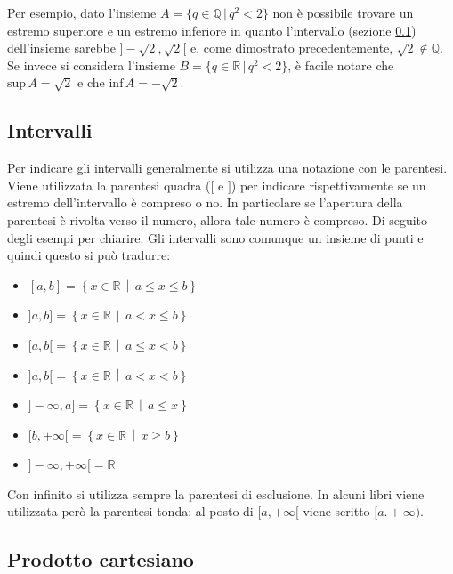 Per esempio, dato l'insieme $A = \{q \in \mathbb{Q}\,|\,q^2 < 2\}$ non è possibile trovare un estremo superiore e un estremo inferiore in quanto l'intervallo (sezione \ref{intervalli}) dell'insieme sarebbe $]-\sqrt{2}, \sqrt{2}[$ e, come dimostrato precedentemente, $\sqrt{2} \notin \mathbb{Q}$. Se invece si considera l'insieme $B = \{q \in \mathbb{R}\,|\,q^2 < 2\}$, è facile notare che $\mathrm{sup}\,A = \sqrt{2}$ e che $\mathrm{inf}\, A = -\sqrt{2}$.

\subsection{Intervalli} \label{intervalli}
Per indicare gli intervalli generalmente si utilizza una notazione con le parentesi. Viene utilizzata la parentesi quadra ($[$ e $]$) per indicare rispettivamente se un estremo dell'intervallo è compreso o no. In particolare se l'apertura della parentesi è rivolta verso il numero, allora tale numero è compreso. Di seguito degli esempi per chiarire. Gli intervalli sono comunque un insieme di punti e quindi questo si può tradurre:
\begin{itemize}
    \item $[a, b] = \left\{ x \in \mathbb{R}\, \middle|\, a \leq x 	\leq b\right\}$
    \item $]a, b] = \left\{ x \in \mathbb{R}\, \middle|\, a < x \leq b\right\}$
    \item $[a, b[ = \left\{ x \in \mathbb{R}\, \middle|\, a \leq x < b\right\}$
    \item $]a, b[ = \left\{ x \in \mathbb{R}\, \middle|\, a < x < b\right\}$
    
    \item $]-\infty, a] = \left\{ x \in \mathbb{R}\, \middle|\, a \leq x \right\}$
    \item $[b, +\infty[ = \left\{ x \in \mathbb{R}\, \middle|\, x \geq b \right\}$
    \item $]-\infty, +\infty[ = \mathbb{R}$
\end{itemize}
Con infinito si utilizza sempre la parentesi di esclusione. In alcuni libri viene utilizzata però la parentesi tonda: al posto di $[a,+\infty[$ viene scritto $[a. +\infty)$.

\subsection{Prodotto cartesiano}

